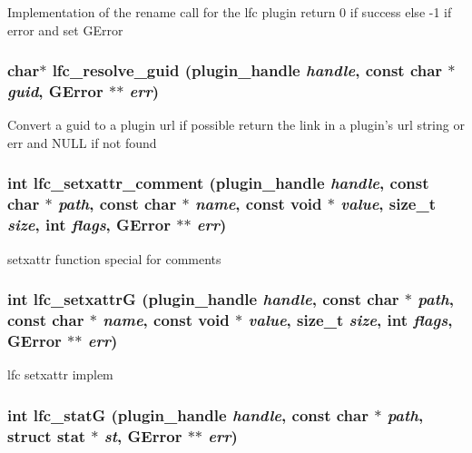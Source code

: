 Implementation of the rename call for the lfc plugin return 0 if success else -1 if error and set GError 
\subsubsection{\setlength{\rightskip}{0pt plus 5cm}char$\ast$ lfc\_\-resolve\_\-guid (plugin\_\-handle {\em handle}, const char $\ast$ {\em guid}, GError $\ast$$\ast$ {\em err})}\label{gfal__common__lfc_8c_5e7057c566c276986a69faa94abd3b82}


Convert a guid to a plugin url if possible return the link in a plugin's url string or err and NULL if not found 
\subsubsection{\setlength{\rightskip}{0pt plus 5cm}int lfc\_\-setxattr\_\-comment (plugin\_\-handle {\em handle}, const char $\ast$ {\em path}, const char $\ast$ {\em name}, const void $\ast$ {\em value}, size\_\-t {\em size}, int {\em flags}, GError $\ast$$\ast$ {\em err})}\label{gfal__common__lfc_8c_08bd87b3857f5a147b6defda0c61c5e4}


setxattr function special for comments 
\subsubsection{\setlength{\rightskip}{0pt plus 5cm}int lfc\_\-setxattr\-G (plugin\_\-handle {\em handle}, const char $\ast$ {\em path}, const char $\ast$ {\em name}, const void $\ast$ {\em value}, size\_\-t {\em size}, int {\em flags}, GError $\ast$$\ast$ {\em err})}\label{gfal__common__lfc_8c_678da8773fc09be4050e03a4a21eadf9}


lfc setxattr implem 
\subsubsection{\setlength{\rightskip}{0pt plus 5cm}int lfc\_\-stat\-G (plugin\_\-handle {\em handle}, const char $\ast$ {\em path}, struct stat $\ast$ {\em st}, GError $\ast$$\ast$ {\em err})}\label{gfal__common__lfc_8c_ab708b142708ecaa8283d0a996a4dd32}


